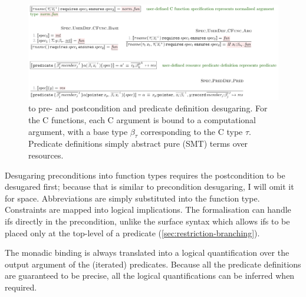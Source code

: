 \begin{figure}[tp]
    \includegraphics{figures/prepost-to-kernel}
    \caption{ to  pre- and postcondition and predicate
        definition desugaring. For the C functions, each C argument is bound to
        a computational argument, with a base type $\beta_\tau$ corresponding
        to the C type $\tau$. Predicate definitions simply abstract pure (SMT)
        terms over resources.}\label{fig:prepost-to-kernel}
\end{figure}

Desugaring preconditions into function types requires the postcondition to be
desugared first; because that is similar to precondition desugaring, I will
omit it for space. Abbreviations are simply substituted into the function
type.\label{sn:abbrev}
Constraints are mapped into logical implications. The formalisation can handle
ifs directly in the precondition, unlike the surface syntax which allows ifs to be placed
only at the top-level of a predicate (\cref{sec:restriction-branching}).

The monadic binding  is always translated into a logical %
quantification over the output argument of the (iterated) predicates. Because
all the predicate definitions are guaranteed to be precise, all the logical
quantifications can be inferred when required.

